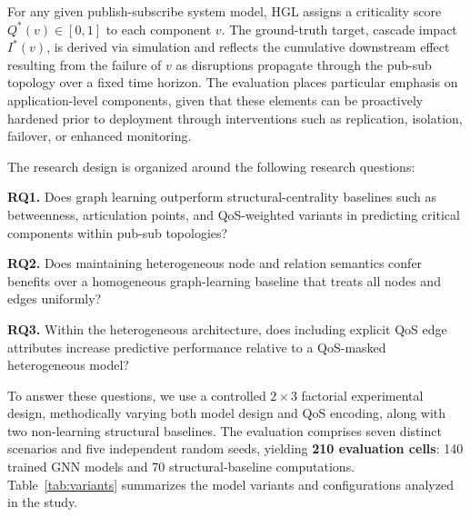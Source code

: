 \documentclass[sigconf,9pt,anonymous]{acmart}
\begin{document}
For any given publish-subscribe system model, HGL assigns a criticality score $Q^*(v) \in [0,1]$ to each component $v$. The ground-truth target, cascade impact $I^*(v)$, is derived via simulation and reflects the cumulative downstream effect resulting from the failure of $v$ as disruptions propagate through the pub-sub topology over a fixed time horizon. The evaluation places particular emphasis on application-level components, given that these elements can be proactively hardened prior to deployment through interventions such as replication, isolation, failover, or enhanced monitoring.

The research design is organized around the following research questions:

\textbf{RQ1.} Does graph learning outperform structural-centrality baselines such as betweenness, articulation points, and QoS-weighted variants in predicting critical components within pub-sub topologies?

\textbf{RQ2.} Does maintaining heterogeneous node and relation semantics confer benefits over a homogeneous graph-learning baseline that treats all nodes and edges uniformly?

\textbf{RQ3.} Within the heterogeneous architecture, does including explicit QoS edge attributes increase predictive performance relative to a QoS-masked heterogeneous model?

To answer these questions, we use a controlled $2\times3$ factorial experimental design, methodically varying both model design and QoS encoding, along with two non-learning structural baselines. The evaluation comprises seven distinct scenarios and five independent random seeds, yielding \textbf{210 evaluation cells}: 140 trained GNN models and 70 structural-baseline computations. Table~\ref{tab:variants} summarizes the model variants and configurations analyzed in the study.
\end{document}
